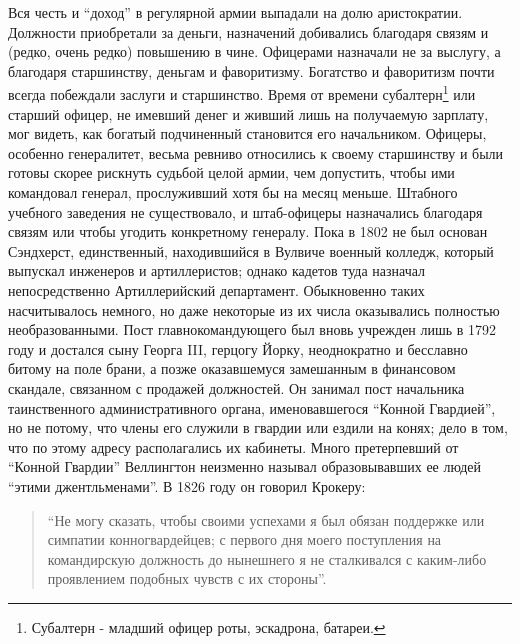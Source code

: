 \documentclass[
  oneside,
  12pt,
  titlepage]{book}
\begin{document}
Вся честь и ``доход'' в регулярной армии выпадали на долю аристократии. Должности приобретали за деньги, назначений добивались благодаря связям и (редко, очень редко) повышению в чине. Офицерами назначали не за выслугу, а благодаря старшинству, деньгам и фаворитизму. Богатство и фаворитизм почти всегда побеждали заслуги и старшинство. Время от времени субалтерн\footnote{Субалтерн - младший офицер роты, эскадрона, батареи.} или старший офицер, не имевший денег и живший лишь на получаемую зарплату, мог видеть, как богатый подчиненный становится его начальником. Офицеры, особенно генералитет, весьма ревниво относились к своему старшинству и были готовы скорее рискнуть судьбой целой армии, чем допустить, чтобы ими командовал генерал, прослуживший хотя бы на месяц меньше. Штабного учебного заведения не существовало, и штаб-офицеры назначались благодаря связям или чтобы угодить конкретному генералу. Пока в 1802 не был основан Сэндхерст, единственный, находившийся в Вулвиче военный колледж, который выпускал инженеров и артиллеристов; однако кадетов туда назначал непосредственно Артиллерийский департамент. Обыкновенно таких насчитывалось немного, но даже некоторые из их числа оказывались полностью необразованными. Пост главнокомандующего был вновь учрежден лишь в 1792 году и достался сыну Георга III, герцогу Йорку, неоднократно и бесславно битому на поле брани, а позже оказавшемуся замешанным в финансовом скандале, связанном с продажей должностей. Он занимал пост начальника таинственного административного органа, именовавшегося ``Конной Гвардией'', но не потому, что члены его служили в гвардии или ездили на конях; дело в том, что по этому адресу располагались их кабинеты. Много претерпевший от ``Конной Гвардии'' Веллингтон неизменно называл образовывавших ее людей ``этими джентльменами''. В 1826 году он говорил Крокеру:

\begin{quote}
``Не могу сказать, чтобы своими успехами я был обязан поддержке или симпатии конногвардейцев; с первого дня моего поступления на командирскую должность до нынешнего я не сталкивался с каким-либо проявлением подобных чувств с их стороны''.
\end{quote}
\end{document}
